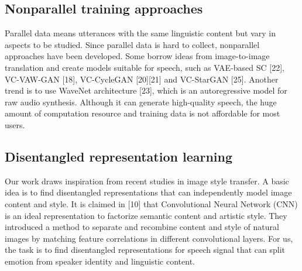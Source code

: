 \documentclass{article}
\begin{document}
\subsection{Nonparallel training approaches}
Parallel data means utterances with the same linguistic content but vary in aspects to be studied. Since parallel data is hard to collect, nonparallel approaches have been developed. Some borrow ideas from image-to-image translation and create models suitable for speech, such as VAE-based SC [22], VC-VAW-GAN [18], VC-CycleGAN [20][21] and VC-StarGAN [25]. Another trend is to use WaveNet architecture [23], which is an autoregressive model for raw audio synthesis. Although it can generate high-quality speech, the huge amount of computation resource and training data is not affordable for most users.


\subsection{Disentangled representation learning}
Our work draws inspiration from recent studies in image style transfer. A basic idea is to find disentangled representations that can independently model image content and style. It is claimed in [10] that Convolutional Neural Network (CNN) is an ideal representation to factorize semantic content and artistic style. They introduced a method to separate and recombine content and style of natural images by matching feature correlations in different convolutional layers. For us, the task is to find disentangled representations for speech signal that can split emotion from speaker identity and linguistic content.


\end{document}
